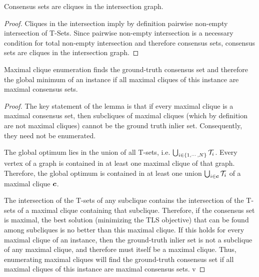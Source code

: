 \begin{lemma}
	Consensus sets are cliques in the intersection graph.
\end{lemma}

\begin{proof}
	Cliques in the intersection imply by definition pairwise non-empty intersection of T-Sets. Since pairwise non-empty intersection is a necessary condition for total non-empty intersection and therefore consensus sets, consensus sets are cliques in the intersection graph.
\end{proof}

\begin{lemma}
	\label{lemma:max-clique-non-helly-app}
	Maximal clique enumeration finds the ground-truth consensus set and therefore the global minimum of an instance if all maximal cliques of this instance are maximal consensus sets.
\end{lemma}

\begin{proof}
	The key statement of the lemma is that if every maximal clique is a maximal consensus set, then subcliques of maximal cliques (which by definition are not maximal cliques) cannot be the ground truth inlier set. Consequently, they need not be enumerated. 

	The global optimum lies in the union of all T-sets, i.e. $\bigcup_{i \in  \{1, \cdots, N\} } \mathcal{T}_i$. Every vertex of a graph is contained in at least one maximal clique of that graph. Therefore, the global optimum is contained in at least one union $\bigcup_{i \in \boldsymbol{c}} \mathcal{T}_i$ of a maximal clique $\boldsymbol{c}$.

	The intersection of the T-sets of any subclique contains the intersection of the T-sets of a maximal clique containing that subclique. Therefore, if the consensus set is maximal, the best solution (minimizing the TLS objective) that can be found among subcliques is no better than this maximal clique. If this holds for every maximal clique of an instance, then the ground-truth inlier set is not a subclique of any maximal clique, and therefore must itself be a maximal clique. Thus, enumerating maximal cliques will find the ground-truth consensus set if all maximal cliques of this instance are maximal consensus sets. v
\end{proof}

\label{proof:wls-interval-analysis-rotation}


